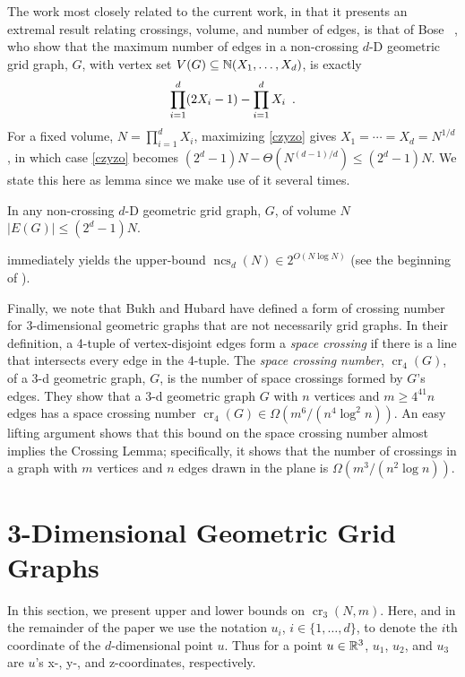 \documentclass{patmorin}
\newcommand{\n}{N}
\DeclareMathOperator{\crs}{cr}
\DeclareMathOperator{\ncs}{ncs}
\begin{document}
The work most closely related to the current work, in that it presents
an extremal result relating crossings, volume, and number of edges, is
that of Bose \etal~\cite{bose.czyzowicz.ea:maximum}, who show that the
maximum number of edges in a non-crossing $d$-D geometric grid graph,
$G$, with vertex set $V(G)\subseteq \mathbb{N}(X_1,\ldots,X_d)$, is exactly
\begin{equation}
    \prod_{i=1}^d (2X_i-1) - \prod_{i=1}^d X_i \enspace . \eqlabel{czyzo}
\end{equation}
For a fixed volume, $\n=\prod_{i=1}^d X_i$, maximizing \eqref{czyzo} gives
$X_1=\cdots=X_d=\n^{1/d}$, in which case \eqref{czyzo} becomes $(2^d-1)\n -
\Theta(\n^{(d-1)/d})\le (2^d-1)\n$.  We state this here as lemma since we
make use of it several times.
\begin{lem}
  In any non-crossing $d$-D geometric grid graph, $G$, of volume $\n$
  $|E(G)|\le(2^d-1)\n$.
\end{lem}
 immediately yields the upper-bound
$\ncs_d(\n)\in2^{O(\n\log\n)}$ (see the beginning of
).

Finally, we note that Bukh and Hubard \cite{bukh.hubard:space} have
defined a form of crossing number for 3-dimensional geometric graphs
that are not necessarily grid graphs.  In their definition, a 4-tuple
of vertex-disjoint edges form a \emph{space crossing} if there is
a line that intersects every edge in the 4-tuple.  The \emph{space
crossing number}, $\crs_4(G)$, of a 3-d geometric graph, $G$, is the
number of space crossings formed by $G$'s edges.  They show that a
3-d geometric graph $G$ with $n$ vertices and $m\ge 4^{41}n$ edges
has a space crossing number $\crs_4(G) \in \Omega(m^6/(n^4\log^2 n))$.
An easy lifting argument shows that this bound on the space crossing
number almost implies the Crossing Lemma; specifically, it shows that
the number of crossings in a graph with $m$ vertices and $n$ edges drawn
in the plane is $\Omega(m^3/(n^2\log n))$.

\section{3-Dimensional Geometric Grid Graphs}

In this section, we present upper and lower bounds on $\crs_3(\n,m)$.
Here, and in the remainder of the paper we use the notation
$u_i$, $i\in\{1,\ldots,d\}$, to denote the $i$th coordinate of the
$d$-dimensional point $u$.  Thus for a point $u\in\mathbb{R}^3$, $u_1$, $u_2$,
and $u_3$ are $u$'s x-, y-, and z-coordinates, respectively.
\end{document}
